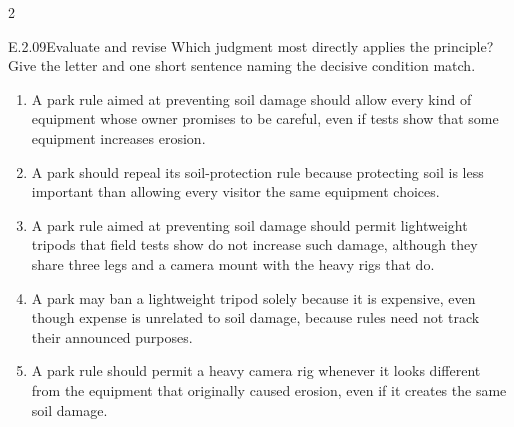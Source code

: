 \documentclass[9pt]{extarticle}
\newcommand{\choice}[1]{\item #1}
\begin{document}
\begin{multicols}{2}
\begin{DenseCoreProblem}{E.2.09}{Evaluate and revise}
Which judgment most directly applies the principle? Give the letter and one short sentence naming the decisive condition match.
\begin{enumerate}[label=(\alph*)]
  \choice{A park rule aimed at preventing soil damage should allow every kind of equipment whose owner promises to be careful, even if tests show that some equipment increases erosion.}
  \choice{A park should repeal its soil-protection rule because protecting soil is less important than allowing every visitor the same equipment choices.}
  \choice{A park rule aimed at preventing soil damage should permit lightweight tripods that field tests show do not increase such damage, although they share three legs and a camera mount with the heavy rigs that do.}
  \choice{A park may ban a lightweight tripod solely because it is expensive, even though expense is unrelated to soil damage, because rules need not track their announced purposes.}
  \choice{A park rule should permit a heavy camera rig whenever it looks different from the equipment that originally caused erosion, even if it creates the same soil damage.}
\end{enumerate}
\end{DenseCoreProblem}
\end{multicols}
\CoreWorkArea
\FormBreak
{}
\end{document}
